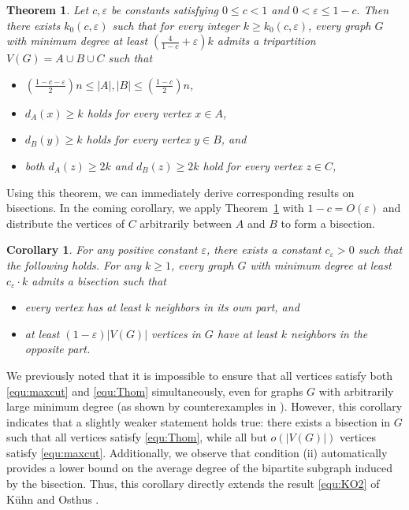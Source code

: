 \documentclass{aic}
\newtheorem{theorem}[dfn]{Theorem}
\newtheorem{corollary}[dfn]{Corollary}
\begin{document}
	
	\begin{theorem}\label{Thm:int-bisec-exact}
		Let $c, \varepsilon$ be constants satisfying $0\leq c<1$ and $0<\varepsilon\leq 1-c.$
		Then there exists $k_0(c, \varepsilon)$ such that for every integer $k\geq k_0(c, \varepsilon)$,
		every graph $G$ with minimum degree at least $\left(\frac{4}{1-c}+\varepsilon\right)k$ admits a tripartition $V(G)=A\cup B\cup C$ such that
		\begin{itemize}
			\item[(1).] $\left(\frac{1-c-\varepsilon}{2}\right)n\leq |A|,|B|\leq \left(\frac{1-c}{2}\right)n$,
			\item[(2).] $d_{A}(x)\geq k$ holds for every vertex $x\in A$,
			\item[(3).] $d_{B}(y)\geq k$ holds for every vertex $y\in B$, and
			\item[(4).] both $d_{A}(z)\geq 2k$ and $d_{B}(z)\geq 2k$ hold for every vertex $z\in C$,
		\end{itemize}
	\end{theorem}
	
	
	Using this theorem, we can immediately derive corresponding results on bisections.
	In the coming corollary, we apply Theorem~\ref{Thm:int-bisec-exact} with $1 - c = O(\varepsilon)$ and distribute the vertices of $C$ arbitrarily between $A$ and $B$ to form a bisection.
	
	\begin{corollary}\label{coro:int-bisec-main}
		For any positive constant $\varepsilon$, there exists a constant $c_\varepsilon>0$ such that the following holds.
		For any $k\geq 1$, every graph $G$ with minimum degree at least $c_\varepsilon\cdot k$ admits a bisection such that
		\begin{itemize}
			\item[(i).] every vertex has at least $k$ neighbors in its own part, and
			\item[(ii).] at least $(1-\varepsilon)|V(G)|$ vertices in $G$ have at least $k$ neighbors in the opposite part.
		\end{itemize}
	\end{corollary}
	
	We previously noted that it is impossible to ensure that all vertices satisfy both \eqref{equ:maxcut} and \eqref{equ:Thom} simultaneously, even for graphs $G$ with arbitrarily large minimum degree (as shown by counterexamples in \cite{KO}).
	However, this corollary indicates that a slightly weaker statement holds true: there exists a bisection in $G$ such that all vertices satisfy \eqref{equ:Thom}, while all but $o(|V(G)|)$ vertices satisfy \eqref{equ:maxcut}.
	Additionally, we observe that condition (ii) automatically provides a lower bound on the average degree of the bipartite subgraph induced by the bisection.
	Thus, this corollary directly extends the result \eqref{equ:KO2} of K\"uhn and Osthus \cite{KO}.
	
\end{document}

